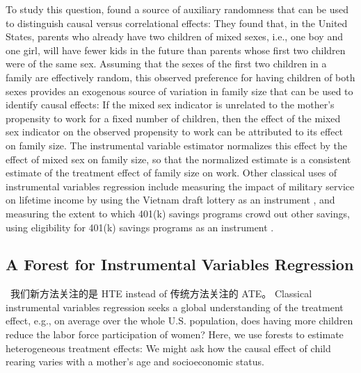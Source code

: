 \documentclass[aos]{imsart}
\theoremstyle{plain}
\theoremstyle{definition}
\theoremstyle{remark}
\begin{document}
\begin{CJK}{UTF8}{gbsn}
To study this question, \citet{angrist1998children} found a source of auxiliary randomness that can
be used to distinguish causal versus correlational effects: They found that, in the United States, parents who already
have two children of mixed sexes, i.e., one boy and one girl, will have fewer kids in the future than parents
whose first two children were of the same sex. Assuming that the sexes of the first two children in a family
are effectively random, this observed preference for having children of both sexes provides an exogenous source
of variation in family size that can be used to identify causal effects: If the mixed sex indicator is unrelated
to the mother's propensity to work for a fixed number of children, then the effect of the mixed sex 
indicator on the observed propensity to work can be attributed to its effect on family size.  The instrumental
variable estimator normalizes this effect by the effect of mixed sex on family size, so that the normalized estimate
is a consistent estimate of the treatment effect of family size on work.
Other classical uses of instrumental variables regression include measuring the impact of military
service on lifetime income by using the Vietnam draft lottery as an instrument \citep{angrist1990lifetime}, 
and measuring the extent to which 401(k) savings programs crowd out other savings, using eligibility for 401(k) savings programs as an instrument \citep{abadie2003semiparametric,poterba1996retirement}.

\subsection{A Forest for Instrumental Variables Regression}
\label{sec:iv_methods}

\, 我们新方法关注的是 HTE instead of 传统方法关注的 ATE。 Classical instrumental variables regression seeks a global understanding of the treatment effect, e.g., on average over the whole U.S. population, does having more children reduce the labor force participation
of women? Here, we use forests to estimate heterogeneous
treatment effects: We might ask how the causal effect of child rearing varies with a mother's age and socioeconomic status.


\end{CJK}
\end{document}
